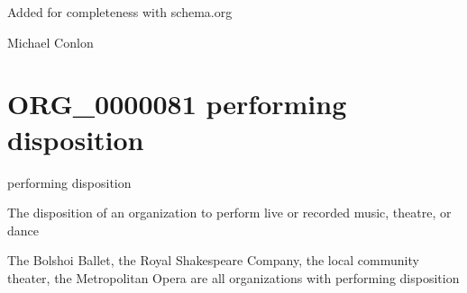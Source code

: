 \documentclass[letterpaper,10pt,english]{sphinxmanual}
\begin{document}
\begin{sphinxShadowBox}

\sphinxAtStartPar
Added for completeness with schema.org
\end{sphinxShadowBox}

\begin{sphinxShadowBox}

\sphinxAtStartPar
Michael Conlon 
\end{sphinxShadowBox}
\begin{quote}
\label{\detokenize{doc-ORG_0000081:org-0000081}}\label{\detokenize{doc-ORG_0000081:performing-disposition}}\label{\detokenize{doc-ORG_0000081:org-0000081}}
\ignorespaces \end{quote}


\section{ORG\_0000081 \sphinxhyphen{} performing disposition}
\label{\detokenize{doc-ORG_0000081:org-0000081-performing-disposition}}\label{\detokenize{doc-ORG_0000081:index-0}}\label{\detokenize{doc-ORG_0000081::doc}}
\begin{sphinxShadowBox}

\sphinxAtStartPar
performing disposition
\end{sphinxShadowBox}

\begin{sphinxShadowBox}

\sphinxAtStartPar
The disposition of an organization to perform live or recorded music, theatre, or dance
\end{sphinxShadowBox}

\begin{sphinxShadowBox}

\sphinxAtStartPar
{}
\end{sphinxShadowBox}

\begin{sphinxShadowBox}

\sphinxAtStartPar
The Bolshoi Ballet, the Royal Shakespeare Company, the local community theater, the Metropolitan Opera are all organizations with performing disposition
\end{sphinxShadowBox}
\end{document}
